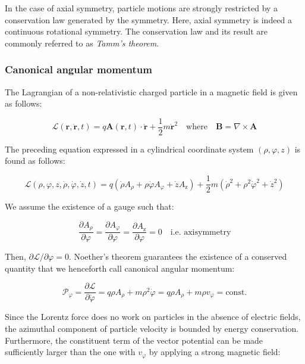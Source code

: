 In the case of axial symmetry, particle motions are strongly restricted by a conservation law generated by the symmetry. Here, axial symmetry is indeed a continuous rotational symmetry. The conservation law and its result are commonly referred to as \textit{Tamm's theorem}.

\subsubsection{Canonical angular momentum}

The Lagrangian of a non-relativistic charged particle in a magnetic field is given as follows:

\begin{equation}
    \mathcal{L}(\mathbf{r},\dot{\mathbf{r}}, t)=q\mathbf{A}(\mathbf{r},t)\cdot\dot{\mathbf{r}}+\frac{1}{2}m\dot{\mathbf{r}}^2\quad\text{where}\quad\mathbf{B}=\nabla\times\mathbf{A}
\end{equation}

The preceding equation expressed in a cylindrical coordinate system $(\rho,\varphi,z)$ is found as follows:

\begin{equation}
    \mathcal{L}(\rho,\varphi,z,\dot{\rho},\dot{\varphi},\dot{z},t)=q\left(\dot{\rho}A_\rho+\rho\dot{\varphi}A_\varphi+\dot{z}A_\text{z}\right)+\frac{1}{2}m\left(\dot{\rho}^2+\rho^2\dot{\varphi}^2+\dot{z}^2\right)
\end{equation}

We assume the existence of a gauge such that:

\begin{equation}
    \frac{\partial A_\rho}{\partial\varphi}=\frac{\partial A_\varphi}{\partial\varphi}=\frac{\partial A_\text{z}}{\partial \varphi}=0\quad\text{i.e. axisymmetry}
\end{equation}

Then, $\partial\mathcal{L}/\partial\varphi=0$. Noether's theorem guarantees the existence of a conserved quantity that we henceforth call canonical angular momentum:

\begin{equation}
    \mathcal{P}_\varphi=\frac{\partial\mathcal{L}}{\partial\dot{\varphi}}=q\rho A_\rho+m\rho^2\dot{\varphi}=q\rho A_\rho+m\rho v_\varphi=\text{const.}
\end{equation}

Since the Lorentz force does no work on particles in the absence of electric fields, the azimuthal component of particle velocity is bounded by energy conservation. Furthermore, the constituent term of the vector potential can be made sufficiently larger than the one with $v_\varphi$ by applying a strong magnetic field:


